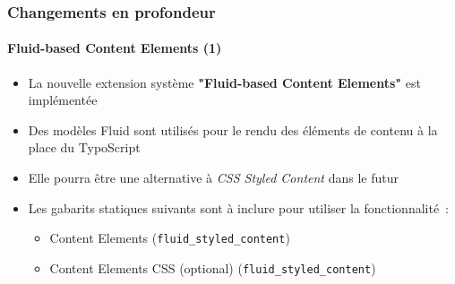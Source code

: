 \begin{frame}[fragile]
	\frametitle{Changements en profondeur}
	\framesubtitle{Fluid-based Content Elements (1)}

	\begin{itemize}

		\item La nouvelle extension système \textbf{"Fluid-based Content Elements"} est implémentée

		\item Des modèles Fluid sont utilisés pour le rendu des éléments de contenu à la place du TypoScript

		\item Elle pourra être une alternative à \textit{CSS Styled Content} dans le futur

		\item Les gabarits statiques suivants sont à inclure pour utiliser la fonctionnalité~:

			\begin{itemize}
				\item Content Elements (\texttt{fluid\_styled\_content})
				\item Content Elements CSS (optional) (\texttt{fluid\_styled\_content})
			\end{itemize}

	\end{itemize}

\end{frame}




